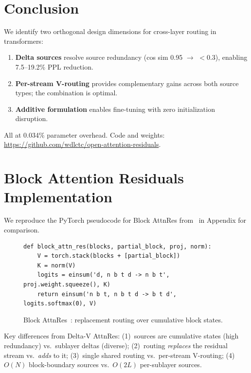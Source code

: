 \documentclass{article}
\begin{document}
\section{Conclusion}

We identify two orthogonal design dimensions for cross-layer routing in transformers:
\begin{enumerate}
    \item \textbf{Delta sources} resolve source redundancy (cos sim 0.95 $\to$ $<$0.3), enabling 7.5--19.2\% PPL reduction.
    \item \textbf{Per-stream V-routing} provides complementary gains across both source types; the combination is optimal.
    \item \textbf{Additive formulation} enables fine-tuning with zero initialization disruption.
\end{enumerate}
All at 0.034\% parameter overhead. Code and weights: \url{https://github.com/wdlctc/open-attention-residuals}.




\newpage
\appendix

\section{Block Attention Residuals Implementation}
\label{app:block_attnres}

We reproduce the PyTorch pseudocode for Block AttnRes from~\citet{kimi2025attention} in Appendix for comparison.

\begin{figure}[h]
\begin{lstlisting}[style=python]
def block_attn_res(blocks, partial_block, proj, norm):
    V = torch.stack(blocks + [partial_block])
    K = norm(V)
    logits = einsum('d, n b t d -> n b t', proj.weight.squeeze(), K)
    return einsum('n b t, n b t d -> b t d', logits.softmax(0), V)
\end{lstlisting}
\caption{Block AttnRes~\citep{kimi2025attention}: replacement routing over cumulative block states.}
\end{figure}

Key differences from Delta-V AttnRes: (1)~sources are cumulative states (high redundancy) vs.\ sublayer deltas (diverse); (2)~routing \emph{replaces} the residual stream vs.\ \emph{adds} to it; (3)~single shared routing vs.\ per-stream V-routing; (4)~$O(N)$ block-boundary sources vs.\ $O(2L)$ per-sublayer sources.
\end{document}
